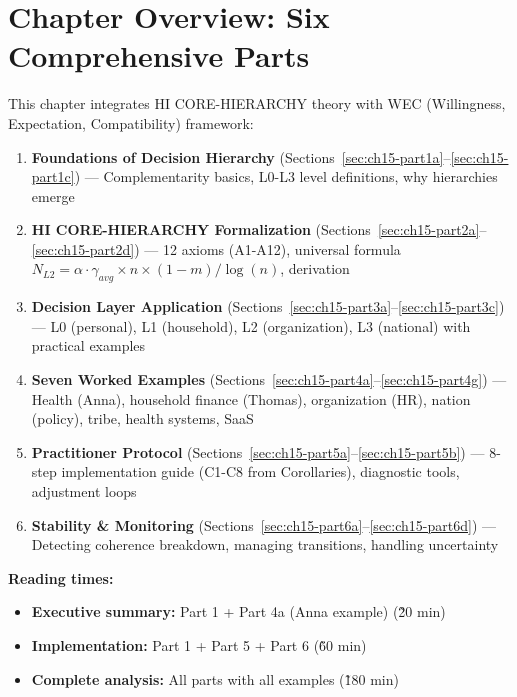 \documentclass[11pt, a4paper]{article}
\begin{document}

\section*{Chapter Overview: Six Comprehensive Parts}

This chapter integrates HI CORE-HIERARCHY theory with WEC (Willingness, Expectation, Compatibility) framework:

\begin{enumerate}[label=\textbf{\arabic*.}]

\item \textbf{Foundations of Decision Hierarchy} (Sections~\ref{sec:ch15-part1a}--\ref{sec:ch15-part1c})
   — Complementarity basics, L0-L3 level definitions, why hierarchies emerge

\item \textbf{HI CORE-HIERARCHY Formalization} (Sections~\ref{sec:ch15-part2a}--\ref{sec:ch15-part2d})
   — 12 axioms (A1-A12), universal formula $N_{L2} = \alpha \cdot \gamma_{avg} \times n \times (1-m) / \log(n)$, derivation

\item \textbf{Decision Layer Application} (Sections~\ref{sec:ch15-part3a}--\ref{sec:ch15-part3c})
   — L0 (personal), L1 (household), L2 (organization), L3 (national) with practical examples

\item \textbf{Seven Worked Examples} (Sections~\ref{sec:ch15-part4a}--\ref{sec:ch15-part4g})
   — Health (Anna), household finance (Thomas), organization (HR), nation (policy), tribe, health systems, SaaS

\item \textbf{Practitioner Protocol} (Sections~\ref{sec:ch15-part5a}--\ref{sec:ch15-part5b})
   — 8-step implementation guide (C1-C8 from Corollaries), diagnostic tools, adjustment loops

\item \textbf{Stability \& Monitoring} (Sections~\ref{sec:ch15-part6a}--\ref{sec:ch15-part6d})
   — Detecting coherence breakdown, managing transitions, handling uncertainty

\end{enumerate}

\textbf{Reading times:}
\begin{itemize}[nosep]
   \item \textbf{Executive summary:} Part 1 + Part 4a (Anna example) (\~20 min)
   \item \textbf{Implementation:} Part 1 + Part 5 + Part 6 (\~60 min)
   \item \textbf{Complete analysis:} All parts with all examples (\~180 min)
\end{itemize}
\end{document}
